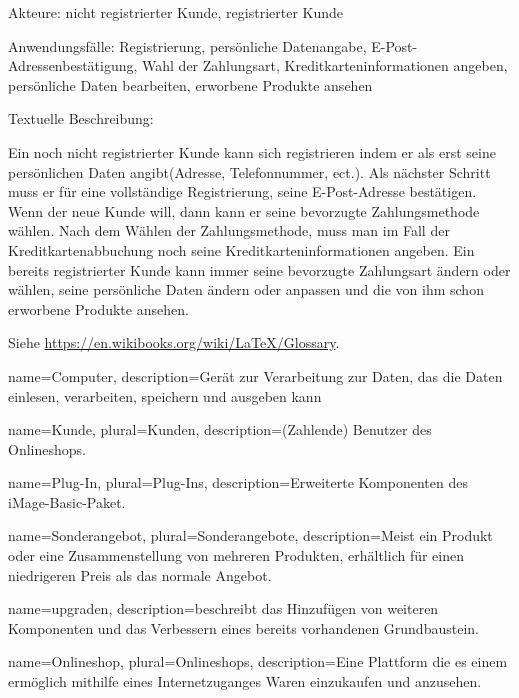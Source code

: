 \documentclass[parskip=full]{scrartcl}
\begin{document}
Akteure: nicht registrierter \gls{Kunde}, registrierter \gls{Kunde}

Anwendungsfälle: Registrierung, persönliche Datenangabe, E-Post-Adressenbestätigung, Wahl der Zahlungsart, Kreditkarteninformationen angeben, persönliche Daten bearbeiten, erworbene Produkte ansehen 

Textuelle Beschreibung:

Ein noch nicht registrierter \gls{Kunde} kann sich registrieren indem er als erst seine persönlichen Daten angibt(Adresse, Telefonnummer, ect.). Als nächster Schritt muss er für eine vollständige Registrierung, seine E-Post-Adresse bestätigen. Wenn der neue \gls{Kunde} will, dann kann er seine bevorzugte Zahlungsmethode wählen. Nach dem Wählen der Zahlungsmethode, muss man im Fall der Kreditkartenabbuchung noch seine Kreditkarteninformationen angeben.
Ein bereits registrierter \gls{Kunde} kann immer seine bevorzugte Zahlungsart ändern oder wählen, seine persönliche Daten ändern oder anpassen und die von ihm schon erworbene Produkte ansehen. 


%
%
\printglossaries
Siehe \url{https://en.wikibooks.org/wiki/LaTeX/Glossary}.

%
%
{
  name=Computer,
  description={Gerät zur Verarbeitung zur Daten, das die Daten einlesen, verarbeiten, speichern und ausgeben kann}
}

{
	name=Kunde,
	plural=Kunden,
	description={(Zahlende) Benutzer des Onlineshops.}
}

{
	name=Plug-In,
	plural=Plug-Ins,
	description={Erweiterte Komponenten des iMage-Basic-Paket.}
}

{
	name=Sonderangebot,
	plural=Sonderangebote,
	description={Meist ein Produkt oder eine Zusammenstellung von mehreren Produkten, erhältlich für einen niedrigeren Preis als das normale Angebot.}
}

{
	name=upgraden,
	description={beschreibt das Hinzufügen von weiteren Komponenten und das Verbessern eines bereits vorhandenen Grundbaustein.}
}

{
	name=Onlineshop,
	plural=Onlineshops,
	description={Eine Plattform die es einem ermöglich mithilfe eines Internetzuganges Waren einzukaufen und anzusehen.}
}
\end{document}
